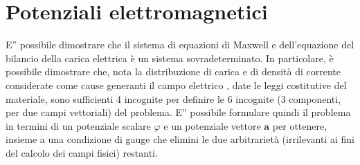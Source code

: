 \documentclass[letterpaper,10pt,italian]{jupyterBook}
\begin{document}
\chapter{Potenziali elettromagnetici}
\label{\detokenize{ch/potentials:potenziali-elettromagnetici}}\label{\detokenize{ch/potentials:classical-electromagnetism-potentials}}\label{\detokenize{ch/potentials::doc}}
\sphinxAtStartPar
E” possibile dimostrare che il sistema di equazioni di Maxwell e dell’equazione del bilancio della carica elettrica è un sistema sovra\sphinxhyphen{}determinato.
In particolare, è possibile dimostrare che, nota la distribuzione di carica e di densità di corrente \sphinxhyphen{} considerate come cause generanti il campo elettrico \sphinxhyphen{}, date le leggi costitutive del materiale, sono sufficienti 4 incognite per definire le 6 incognite (3 componenti, per due campi vettoriali) del problema.
E” possibile formulare quindi il problema in termini di un potenziale scalare \(\varphi\) e un potenziale vettore \(\mathbf{a}\) per ottenere, insieme a una condizione di gauge che elimini le due arbitrarietà (irrilevanti ai fini del calcolo dei campi fisici) restanti.
\end{document}

